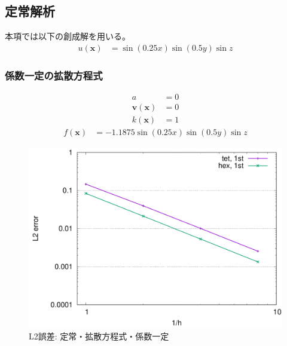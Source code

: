 \documentclass[8pt,a4paper]{article}
\newcommand{\bsm}{\boldsymbol}
\begin{document}
\subsection{定常解析}
本項では以下の創成解を用いる。
\begin{align}
	u (\bsm{x}) &= \sin \left( 0.25 x \right) \sin \left( 0.5 y \right) \sin z 
\end{align}

\subsubsection{係数一定の拡散方程式}
\begin{align}
	a &= 0 \\
	\bsm{v} (\bsm{x}) &= 0 \\
	k (\bsm{x}) &= 1
\end{align}
\begin{align}
	f (\bsm{x}) &= -1.1875 \sin \left( 0.25 x \right) \sin \left( 0.5 y \right) \sin z 
\end{align}
\begin{figure}[h!!]
	\centering
	\includegraphics[width=10.0truecm]{pics/conv_diff_const.pdf}
	\caption{L2誤差: 定常・拡散方程式・係数一定}
	\label{fig:conv_diff_const}
\end{figure}
\end{document}
